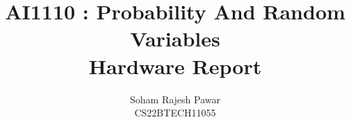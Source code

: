 \documentclass[journal,12pt,twocolumn]{IEEEtran}
\theoremstyle{remark}
\begin{document}
			\title{
				\huge AI1110 : Probability And Random Variables \\ Hardware Report\newline
			}
			\author{\Large Soham Rajesh Pawar\\
			CS22BTECH11055}






\end{document}
